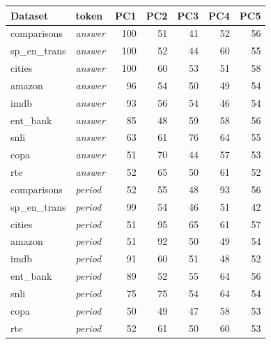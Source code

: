    \begin{tabular}{llrrrrr}
    \toprule
    Dataset & token & PC1 & PC2 & PC3 & PC4 & PC5 \\
    \midrule
    comparisons & \textit{answer} & 100 & 51 & 41 & 52 & 56 \\
    sp\_en\_trans & \textit{answer} & 100 & 52 & 44 & 60 & 55 \\
    cities & \textit{answer} & 100 & 60 & 53 & 51 & 58 \\
    amazon & \textit{answer} & 96 & 54 & 50 & 49 & 54 \\
    imdb & \textit{answer} & 93 & 56 & 54 & 46 & 54 \\
    ent\_bank & \textit{answer} & 85 & 48 & 59 & 58 & 56 \\
    snli & \textit{answer} & 63 & 61 & 76 & 64 & 55 \\
    copa & \textit{answer} & 51 & 70 & 44 & 57 & 53 \\
    rte & \textit{answer} & 52 & 65 & 50 & 61 & 52 \\
    \midrule
    comparisons & \textit{period} & 52 & 55 & 48 & 93 & 56 \\
    sp\_en\_trans & \textit{period} & 99 & 54 & 46 & 51 & 42 \\
    cities & \textit{period} & 51 & 95 & 65 & 61 & 57 \\
    amazon & \textit{period} & 51 & 92 & 50 & 49 & 54 \\
    imdb & \textit{period} & 91 & 60 & 51 & 48 & 52 \\
    ent\_bank & \textit{period} & 89 & 52 & 55 & 64 & 56 \\
    snli & \textit{period} & 75 & 75 & 54 & 64 & 54 \\
    copa & \textit{period} & 50 & 49 & 47 & 58 & 53 \\
    rte & \textit{period} & 52 & 61 & 50 & 60 & 53 \\
    \bottomrule
    \end{tabular}
